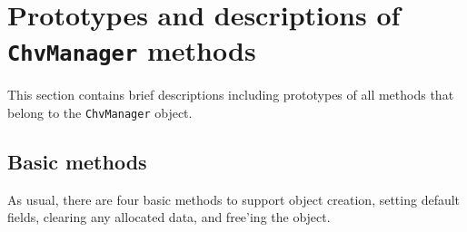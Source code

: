 \par
\section{Prototypes and descriptions of {\tt ChvManager} methods}
\label{section:ChvManager:proto}
\par
This section contains brief descriptions including prototypes
of all methods that belong to the {\tt ChvManager} object.
\par
\subsection{Basic methods}
\label{subsection:ChvManager:proto:basics}
\par
As usual, there are four basic methods to support object creation,
setting default fields, clearing any allocated data, and free'ing
the object.
\par

